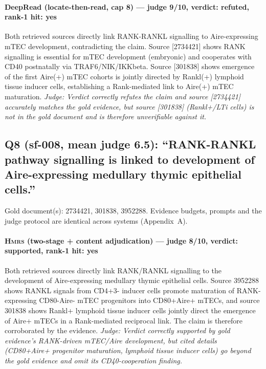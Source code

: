 \documentclass[sigconf, review, anonymous]{acmart}
\begin{document}
\paragraph{DeepRead (locate-then-read, cap 8) --- judge 9/10, verdict: refuted, rank-1 hit: yes}
\noindent Both retrieved sources directly link RANK-RANKL signalling to Aire-expressing mTEC development, contradicting the claim. Source [2734421] shows RANK signalling is essential for mTEC development (embryonic) and cooperates with CD40 postnatally via TRAF6/NIK/IKKbeta. Source [301838] shows emergence of the first Aire(+) mTEC cohorts is jointly directed by Rankl(+) lymphoid tissue inducer cells, establishing a Rank-mediated link to Aire(+) mTEC maturation.
\noindent\small\textit{Judge: Verdict correctly refutes the claim and source [2734421] accurately matches the gold evidence, but source [301838] (Rankl+/LTi cells) is not in the gold document and is therefore unverifiable against it.}

\subsection{Q8 (sf-008, mean judge 6.5): ``RANK-RANKL pathway signalling is linked to development of Aire-expressing medullary thymic epithelial cells.''}
\label{app:q8}
\noindent Gold document(s): 2734421, 301838, 3952288. Evidence budgets, prompts and the judge protocol are identical across systems (Appendix~A).
\paragraph{\textbf{\textsc{Hmrs}} (two-stage + content adjudication) --- judge 8/10, verdict: supported, rank-1 hit: yes}
\noindent Both retrieved sources directly link RANK/RANKL signalling to the development of Aire-expressing medullary thymic epithelial cells. Source 3952288 shows RANKL signals from CD4+3- inducer cells promote maturation of RANK-expressing CD80-Aire- mTEC progenitors into CD80+Aire+ mTECs, and source 301838 shows Rankl+ lymphoid tissue inducer cells jointly direct the emergence of Aire+ mTECs in a Rank-mediated reciprocal link. The claim is therefore corroborated by the evidence.
\noindent\small\textit{Judge: Verdict correctly supported by gold evidence's RANK-driven mTEC/Aire development, but cited details (CD80+Aire+ progenitor maturation, lymphoid tissue inducer cells) go beyond the gold evidence and omit its CD40-cooperation finding.}
\end{document}
